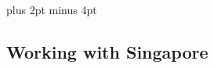 \documentclass[a4paper,titlepage,draft]{article}
\begin{document}
\parindent=0pt %
\parskip=8pt plus 2pt minus 4pt

\setcounter{page}{1}

\tableofcontents
\newpage

\begin{spacing}{1.15}
%

\pagebreak
\section{Working with Singapore}


\end{spacing}
\pagebreak
%

\newpage
\appendix

%
\end{document}
